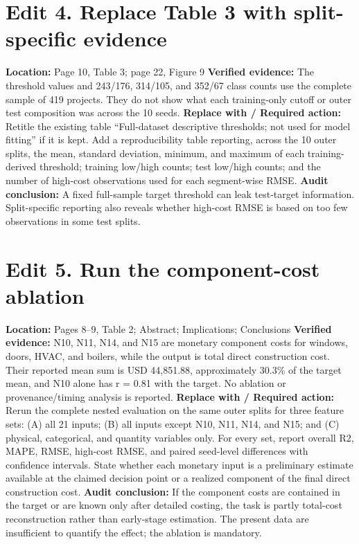 \documentclass[11pt]{article}
\newcommand{\loc}[1]{\textbf{Location:} #1}
\newcommand{\current}[1]{\textbf{Verified evidence:} #1}
\newcommand{\replacewith}[1]{\textbf{Replace with / Required action:}\\{\color{blue}#1}}
\newcommand{\why}[1]{\textbf{Audit conclusion:} #1}
\begin{document}
\section*{Edit 4. Replace Table 3 with split-specific evidence}
\loc{Page 10, Table 3; page 22, Figure 9}
\current{The threshold values and 243/176, 314/105, and 352/67 class counts use the complete sample of 419 projects. They do not show what each training-only cutoff or outer test composition was across the 10 seeds.}
\replacewith{Retitle the existing table ``Full-dataset descriptive thresholds; not used for model fitting'' if it is kept. Add a reproducibility table reporting, across the 10 outer splits, the mean, standard deviation, minimum, and maximum of each training-derived threshold; training low/high counts; test low/high counts; and the number of high-cost observations used for each segment-wise RMSE.}
\why{A fixed full-sample target threshold can leak test-target information. Split-specific reporting also reveals whether high-cost RMSE is based on too few observations in some test splits.}

\section*{Edit 5. Run the component-cost ablation}
\loc{Pages 8--9, Table 2; Abstract; Implications; Conclusions}
\current{N10, N11, N14, and N15 are monetary component costs for windows, doors, HVAC, and boilers, while the output is total direct construction cost. Their reported mean sum is USD 44,851.88, approximately 30.3\% of the target mean, and N10 alone has r = 0.81 with the target. No ablation or provenance/timing analysis is reported.}
\replacewith{Rerun the complete nested evaluation on the same outer splits for three feature sets: (A) all 21 inputs; (B) all inputs except N10, N11, N14, and N15; and (C) physical, categorical, and quantity variables only. For every set, report overall R2, MAPE, RMSE, high-cost RMSE, and paired seed-level differences with confidence intervals. State whether each monetary input is a preliminary estimate available at the claimed decision point or a realized component of the final direct construction cost.}
\why{If the component costs are contained in the target or are known only after detailed costing, the task is partly total-cost reconstruction rather than early-stage estimation. The present data are insufficient to quantify the effect; the ablation is mandatory.}
\end{document}
